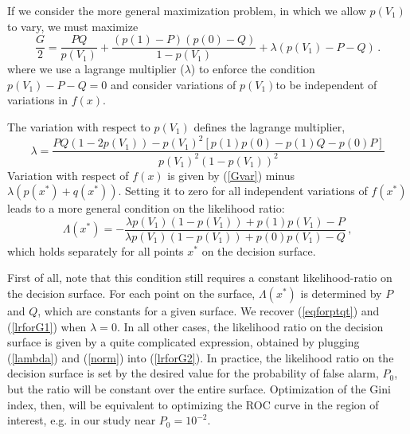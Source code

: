 \documentclass[prd, twocolumn, lengthcheck, superscriptaddress, showpacs, letterpaper, nofootinbib]{revtex4-1}
\newcommand\auxvec{x}
\newcommand\auxvect{\auxvec^{\ast}}
\newcommand\pt{\ensuremath{p(\auxvect)}}
\newcommand\qt{\ensuremath{q(\auxvect)}}
\newcommand\pVg{\ensuremath{p(V_1)}}
\begin{document}
If we consider the more general maximization problem, in which we allow $\pVg$ to vary, we must maximize
\begin{equation}
\label{Gwithconstraint}
\frac{G}{2} = \frac{PQ}{\pVg} + \frac{\left(p(1) - P\right)\left(p(0) - Q\right)}{1-\pVg} + \lambda \left( \pVg - P - Q \right)\,.
\end{equation}
where we use a lagrange multiplier ($\lambda$) to enforce the condition $\pVg - P - Q = 0$ and consider variations of \pVg to be independent of variations in $f(\auxvec)$. 

The variation with respect to $\pVg$ defines the lagrange multiplier, 
\begin{equation}
\label{lambda}
\lambda = \frac{PQ\left( 1- 2\pVg\right) - \pVg^2\left[ p(1)p(0) - p(1)Q - p(0)P\right]}{\pVg^2{\left(1 - \pVg\right)}^2}
\end{equation}
Variation with respect of $f(\auxvec)$ is given by (\ref{Gvar}) minus $\lambda(\pt+ \qt)$. Setting it to zero for all independent variations of $f(\auxvect)$ leads to a more general condition on the likelihood ratio:
\begin{equation}
\label{lrforG2}
\Lambda(\auxvect) = - \frac{\lambda \pVg\left(1 - \pVg\right) + p(1)\pVg - P}{\lambda \pVg\left(1 - \pVg\right) + p(0)\pVg - Q}\,, 
\end{equation}
which holds separately for all points $\auxvect$ on the decision surface.

First of all, note that this condition still requires a constant likelihood-ratio on the decision surface. For each point on the surface, $\Lambda(\auxvect)$ is determined by $P$ and $Q$, which are constants for a given surface. We recover (\ref{eqforptqt}) and (\ref{lrforG1}) when $\lambda = 0$. In all other cases, the likelihood ratio on the decision surface is given by a quite complicated expression, obtained by plugging (\ref{lambda}) and (\ref{norm}) into (\ref{lrforG2}). In practice, the likelihood ratio on the decision surface is set by the desired value for the probability of false alarm, $P_{0}$, but the ratio will be constant over the entire surface. Optimization of the Gini index, then, will be equivalent to optimizing the \ac{ROC} curve in the region of interest, e.g. in our study near $P_{0} = 10^{-2}$.
\end{document}
